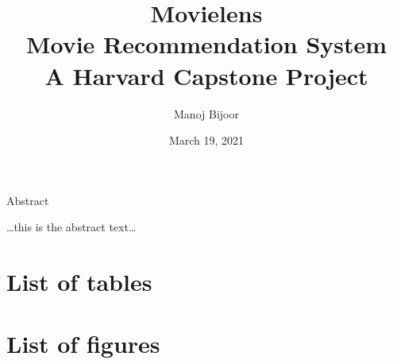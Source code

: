 \documentclass[
]{article}
\title{Movielens\\
Movie Recommendation System\\
A Harvard Capstone Project}
\author{Manoj Bijoor}
\date{March 19, 2021}
\begin{document}
\maketitle



\newpage

\newpage

\begin{center}

\hypertarget{Abstract}{}
\large{Abstract}

\end{center}

\bigskip

\ldots this is the abstract text\ldots{}

\newpage 
\clearpage
{}
\setcounter{secnumdepth}{5}
\setcounter{tocdepth}{5}

\cleardoublepage  \hypertarget{toc}{}
\bookmark[dest=toc,level=chapter]{\contentsname} \tableofcontents

\clearpage

\newpage
\clearpage
{}

\hypertarget{list-of-tables}{%
\section*{List of tables}\label{list-of-tables}}

\renewcommand{\listtablename}{}

\listoftables
\clearpage

\newpage
\clearpage
{}

\hypertarget{list-of-figures}{%
\section*{List of figures}\label{list-of-figures}}

\renewcommand{\listfigurename}{}

\listoffigures
\clearpage

\newpage
\clearpage
{}
\newcommand{\listequationsname}{List of Equations}
\newcommand{\equations}[1]{%
\refstepcounter{equations}
\addcontentsline{equ}{equations}{ \protect\numberline{\theequations}#1}\par}
\end{document}
